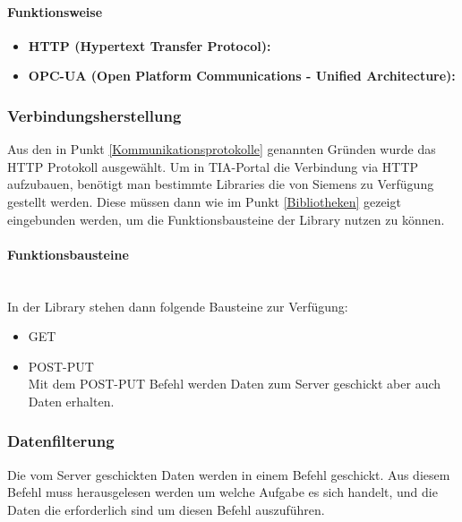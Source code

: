         \paragraph{Funktionsweise}

            \begin{itemize}
                \item \textbf{{HTTP (Hypertext Transfer Protocol):}} \mbox{} \\
                
            
                \item \textbf{{OPC-UA (Open Platform Communications - Unified Architecture):}} \mbox{} \\
                
            \end{itemize}
        
            

    
    \subsubsection{Verbindungsherstellung}
    Aus den in Punkt \ref{Kommunikationsprotokolle} genannten Gründen wurde das HTTP Protokoll ausgewählt. Um in TIA-Portal die Verbindung via HTTP aufzubauen, benötigt man bestimmte Libraries die von Siemens zu Verfügung gestellt werden. Diese müssen dann wie im Punkt \ref{Bibliotheken} gezeigt eingebunden werden, um die Funktionsbausteine der Library nutzen zu können. 

        \paragraph{Funktionsbausteine} \mbox{} \\
        In der Library stehen dann folgende Bausteine zur Verfügung:

        \begin{itemize}
            \item GET
            \item POST-PUT \\
            Mit dem POST-PUT Befehl werden Daten zum Server geschickt aber auch Daten erhalten. 
        \end{itemize}


    \subsubsection{Datenfilterung}
    Die vom Server geschickten Daten werden in einem Befehl geschickt. Aus diesem Befehl muss herausgelesen werden um welche Aufgabe es sich handelt, und die Daten die erforderlich sind um diesen Befehl auszuführen.

